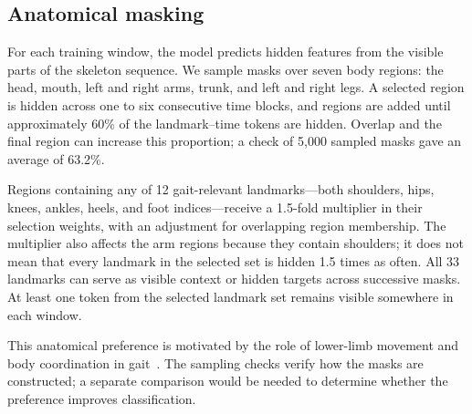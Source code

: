 \subsection{Anatomical masking}
For each training window, the model predicts hidden features from the visible parts of the skeleton sequence. We sample masks over seven body regions: the head, mouth, left and right arms, trunk, and left and right legs. A selected region is hidden across one to six consecutive time blocks, and regions are added until approximately 60\% of the landmark--time tokens are hidden. Overlap and the final region can increase this proportion; a check of 5,000 sampled masks gave an average of 63.2\%.

Regions containing any of 12 gait-relevant landmarks---both shoulders, hips, knees, ankles, heels, and foot indices---receive a 1.5-fold multiplier in their selection weights, with an adjustment for overlapping region membership. The multiplier also affects the arm regions because they contain shoulders; it does not mean that every landmark in the selected set is hidden 1.5 times as often. All 33 landmarks can serve as visible context or hidden targets across successive masks. At least one token from the selected landmark set remains visible somewhere in each window.

This anatomical preference is motivated by the role of lower-limb movement and body coordination in gait~\cite{filli2018,plotnik2020}. The sampling checks verify how the masks are constructed; a separate comparison would be needed to determine whether the preference improves classification.
